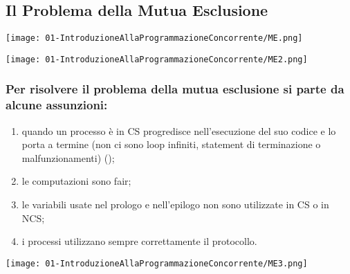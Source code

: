 \subsection{Il Problema della Mutua Esclusione}



\begin{center}
    \texttt{[image: 01-IntroduzioneAllaProgrammazioneConcorrente/ME.png]}
\end{center}


\begin{center}
    \texttt{[image: 01-IntroduzioneAllaProgrammazioneConcorrente/ME2.png]}
\end{center}

\subsubsection{Per risolvere il problema della mutua esclusione si parte da alcune assunzioni:}

\begin{enumerate}
  \item quando un processo è in CS progredisce nell'esecuzione del suo codice e lo porta a termine (non ci sono loop infiniti, statement di terminazione o malfunzionamenti) ();
  \item le computazioni sono fair;
  \item le variabili usate nel prologo e nell'epilogo non sono utilizzate in CS o in NCS;
  \item i processi utilizzano sempre correttamente il protocollo.
\end{enumerate}


\begin{center}
    \texttt{[image: 01-IntroduzioneAllaProgrammazioneConcorrente/ME3.png]}
\end{center}

